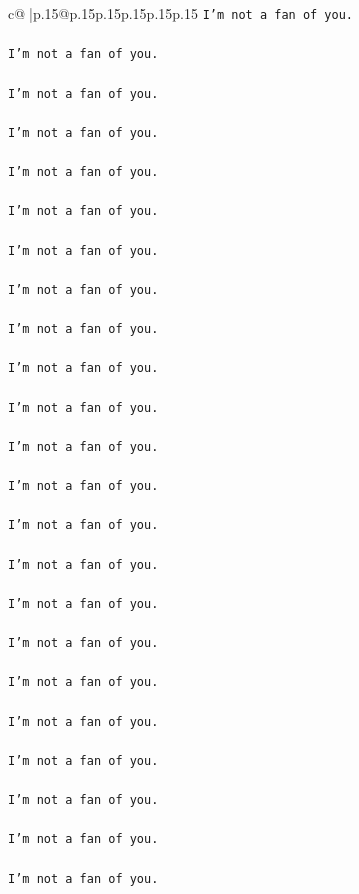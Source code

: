 \documentclass{article}
\begin{document}
{\begin{supertabular}{c@{$\;$}|p{.15\linewidth}@{}p{.15\linewidth}p{.15\linewidth}p{.15\linewidth}p{.15\linewidth}p{.15\linewidth}}
{{{\texttt{I'm not a fan of you.} \\
\\ 
\texttt{I'm not a fan of you.} \\
\\ 
\texttt{I'm not a fan of you.} \\
\\ 
\texttt{I'm not a fan of you.} \\
\\ 
\texttt{I'm not a fan of you.} \\
\\ 
\texttt{I'm not a fan of you.} \\
\\ 
\texttt{I'm not a fan of you.} \\
\\ 
\texttt{I'm not a fan of you.} \\
\\ 
\texttt{I'm not a fan of you.} \\
\\ 
\texttt{I'm not a fan of you.} \\
\\ 
\texttt{I'm not a fan of you.} \\
\\ 
\texttt{I'm not a fan of you.} \\
\\ 
\texttt{I'm not a fan of you.} \\
\\ 
\texttt{I'm not a fan of you.} \\
\\ 
\texttt{I'm not a fan of you.} \\
\\ 
\texttt{I'm not a fan of you.} \\
\\ 
\texttt{I'm not a fan of you.} \\
\\ 
\texttt{I'm not a fan of you.} \\
\\ 
\texttt{I'm not a fan of you.} \\
\\ 
\texttt{I'm not a fan of you.} \\
\\ 
\texttt{I'm not a fan of you.} \\
\\ 
\texttt{I'm not a fan of you.} \\
\\ 
\texttt{I'm not a fan of you.} \\
}}}
\end{supertabular}}
\end{document}
